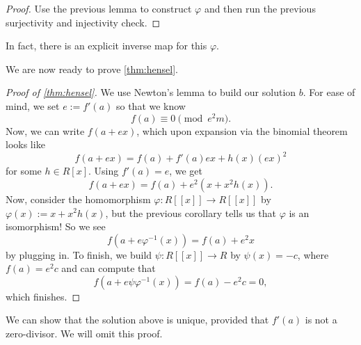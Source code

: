 \begin{proof}
	Use the previous lemma to construct $\varphi$ and then run the previous surjectivity and injectivity check.
\end{proof}
\begin{remark}
	In fact, there is an explicit inverse map for this $\varphi$.
\end{remark}
We are now ready to prove \autoref{thm:hensel}.
\begin{proof}[Proof of \autoref{thm:hensel}]
	We use Newton's lemma to build our solution $b$. For ease of mind, we set $e:=f'(a)$ so that we know
	\[f(a)\equiv0\pmod{e^2m}.\]
	Now, we can write $f(a+ex)$, which upon expansion via the binomial theorem looks like
	\[f(a+ex)=f(a)+f'(a)ex+h(x)(ex)^2\]
	for some $h\in R[x]$. Using $f'(a)=e$, we get
	\[f(a+ex)=f(a)+e^2\left(x+x^2h(x)\right).\]
	Now, consider the homomorphism $\varphi:R[[x]]\to R[[x]]$ by $\varphi(x):=x+x^2h(x)$, but the previous corollary tells us that $\varphi$ is an isomorphism! So we see
	\[f\left(a+e\varphi^{-1}(x)\right)=f(a)+e^2x\]
	by plugging in. To finish, we build $\psi:R[[x]]\to R$ by $\psi(x)=-c$, where $f(a)=e^2c$ and can compute that
	\[f\left(a+e\psi\varphi^{-1}(x)\right)=f(a)-e^2c=0,\]
	which finishes.
\end{proof}
\begin{remark}
	We can show that the solution above is unique, provided that $f'(a)$ is not a zero-divisor. We will omit this proof.
\end{remark}






